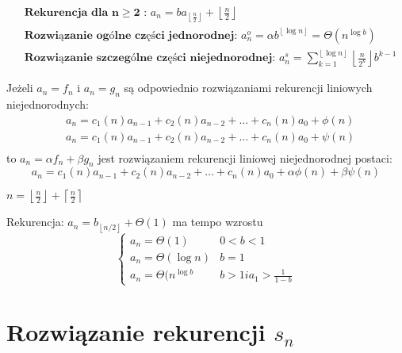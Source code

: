 \documentclass[12pt]{article}
\newcommand{\floor}[1]{\left\lfloor #1  \right\rfloor}
\newcommand{\ceil}[1]{\left\lceil #1 \right\rceil}
\begin{document}
\begin{lemma}

\begin{align*}
    &\textbf{Rekurencja dla n} \ge \textbf{2 : }  a_n = ba_{\floor{\frac{n}{2}}}+\floor{\frac{n}{2}} \\
    &\textbf{Rozwiązanie ogólne części jednorodnej: }  a^o_n=\alpha b^{\floor{\log n}}=\Theta(n^{\log b}) \\
    & \textbf{Rozwiązanie szczególne części niejednorodnej: }  a^s_n=\sum^{\floor{\log n}}_{k=1} \floor{\frac{n}{2^k}}b^{k-1}
\end{align*}

\end{lemma}

\begin{lemma}
Jeżeli $a_n=f_n$ i $a_n=g_n$ są odpowiednio rozwiązaniami rekurencji liniowych niejednorodnych:
\begin{align*}
    & a_n = c_1(n)a_{n-1}+c_2(n)a_{n-2}+\dots+c_n(n)a_0+\phi(n) \\
    & a_n = c_1(n)a_{n-1}+c_2(n)a_{n-2}+\dots+c_n(n)a_0+\psi(n) \\
\end{align*}
to $a_n = \alpha f_n + \beta g_n$ jest rozwiązaniem rekurencji liniowej niejednorodnej postaci:
$$ a_n = c_1(n)a_{n-1}+c_2(n)a_{n-2}+\dots+c_n(n)a_0+\alpha\phi(n)+\beta\psi(n) $$
\end{lemma}

\begin{lemma}
    $ n=\floor{\frac{n}{2}}+\ceil{\frac{n}{2}} $ 
\end{lemma}

\begin{lemma}
    Rekurencja: $a_n = b_{\floor{n/2}} + \Theta(1)$ ma tempo wzrostu 
    $$
    \begin{cases}
    a_n = \Theta(1) &  0<b<1 \\
    a_n = \Theta(\log n) & b=1 \\
    a_n = \Theta(n^{\log b} & b>1 i a_1>\frac{1}{1-b}
    \end{cases}
    $$

    
\end{lemma}

\section*{Rozwiązanie rekurencji $s_n$}
\end{document}
